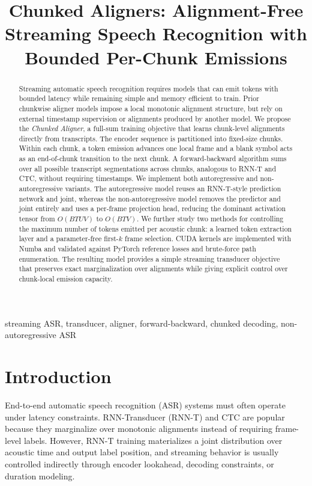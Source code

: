 \documentclass[conference]{IEEEtran}
\title{Chunked Aligners: Alignment-Free Streaming Speech Recognition with Bounded Per-Chunk Emissions}
\author{
  \IEEEauthorblockN{Anonymous Authors}
  \IEEEauthorblockA{Anonymous Affiliation\\
  \texttt{anonymous@example.com}}
}
\begin{document}
\maketitle

\begin{abstract}
Streaming automatic speech recognition requires models that can emit tokens with
bounded latency while remaining simple and memory efficient to train. Prior
chunkwise aligner models impose a local monotonic alignment structure, but rely
on external timestamp supervision or alignments produced by another model. We
propose the \emph{Chunked Aligner}, a full-sum training objective that learns
chunk-level alignments directly from transcripts. The encoder sequence is
partitioned into fixed-size chunks. Within each chunk, a token emission advances
one local frame and a blank symbol acts as an end-of-chunk transition to the next
chunk. A forward-backward algorithm sums over all possible transcript
segmentations across chunks, analogous to RNN-T and CTC, without requiring
timestamps. We implement both autoregressive and non-autoregressive variants.
The autoregressive model reuses an RNN-T-style prediction network and joint,
whereas the non-autoregressive model removes the predictor and joint entirely and
uses a per-frame projection head, reducing the dominant activation tensor from
$O(BTUV)$ to $O(BTV)$. We further study two methods for controlling the maximum
number of tokens emitted per acoustic chunk: a learned token extraction layer and
a parameter-free first-$k$ frame selection. CUDA kernels are implemented with
Numba and validated against PyTorch reference losses and brute-force path
enumeration. The resulting model provides a simple streaming transducer
objective that preserves exact marginalization over alignments while giving
explicit control over chunk-local emission capacity.
\end{abstract}

\begin{IEEEkeywords}
streaming ASR, transducer, aligner, forward-backward, chunked decoding,
non-autoregressive ASR
\end{IEEEkeywords}

\section{Introduction}

End-to-end automatic speech recognition (ASR) systems must often operate under
latency constraints. RNN-Transducer (RNN-T) \cite{graves2012rnnt} and CTC
\cite{graves2006ctc} are popular because they marginalize over monotonic
alignments instead of requiring frame-level labels. However, RNN-T training
materializes a joint distribution over acoustic time and output label position,
and streaming behavior is usually controlled indirectly through encoder
lookahead, decoding constraints, or duration modeling.
\end{document}
